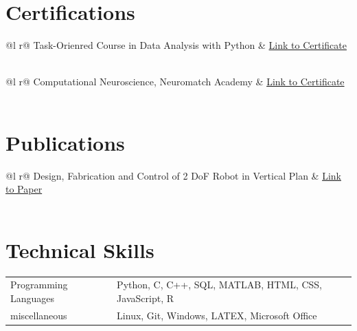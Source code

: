 \documentclass[a4paper,12pt]{article}
\begin{document}

\section{Certifications}

\begin{tabularx}{\linewidth}{ @{}l r@{} }
{Task-Orienred Course in Data Analysis with Python} & \hfill \href{https://quera.org/certificate/7p1aeaOn/}{Link to Certificate} \\[3.75pt]
  \\
\end{tabularx}

\begin{tabularx}{\linewidth}{ @{}l r@{} }
{Computational Neuroscience, Neuromatch Academy} & \hfill \href{https://portal.neuromatchacademy.org/certificate/ee23deef-9e73-4233-8c46-6e85375d9f1b}{Link to Certificate} \\[3.75pt]
  \\
\end{tabularx}


\section{Publications}

\begin{tabularx}{\linewidth}{ @{}l r@{} }
{Design, Fabrication and Control of 2 DoF Robot in Vertical Plan} & \hfill \href{https://civilica.com/doc/1468825/}{Link to Paper} \\[3.75pt]
  \\
\end{tabularx}

\section{Technical Skills}
\begin{tabularx}{\linewidth}{@{}l X@{}}
    Programming Languages &  \normalsize{Python, C, C++, SQL, MATLAB, HTML, CSS, JavaScript, R}\\
    miscellaneous &  \normalsize{Linux, Git, Windows, LATEX, Microsoft Office}\\  
\end{tabularx}
\end{document}
